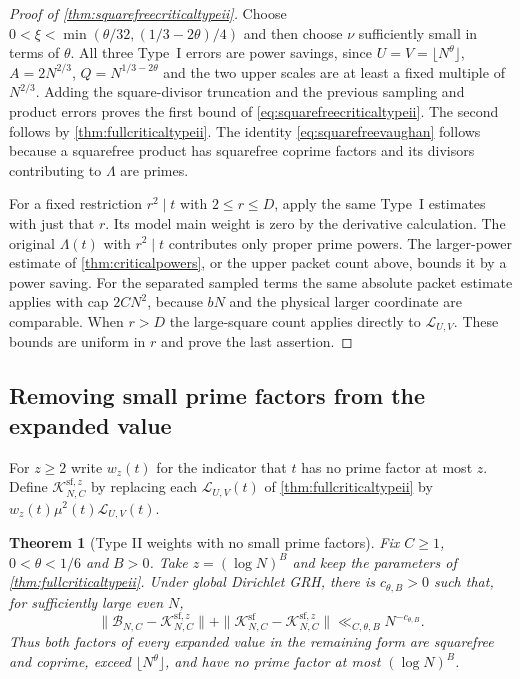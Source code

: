 \documentclass[11pt,a4paper]{article}
\numberwithin{equation}{section}
\newtheorem{theorem}{Theorem}[section]
\begin{document}
\begin{proof}[Proof of \cref{thm:squarefreecriticaltypeii}]
Choose $0<\xi<\min(\theta/32,(1/3-2\theta)/4)$ and
then choose $\nu$ sufficiently small in terms of $\theta$.
All three Type~I errors are power savings, since
$U=V=\lfloor N^\theta\rfloor$, $A=2N^{2/3}$,
$Q=N^{1/3-2\theta}$ and the two upper scales are
at least a fixed multiple of $N^{2/3}$.
Adding the square-divisor truncation and the previous
sampling and product errors proves the first
bound of \cref{eq:squarefreecriticaltypeii}.
The second follows by \cref{thm:fullcriticaltypeii}.
The identity \cref{eq:squarefreevaughan} follows
because a squarefree product has squarefree coprime
factors and its divisors contributing to $\Lambda$
are primes.

For a fixed restriction $r^2\mid t$ with $2\le r\le D$,
apply the same Type~I estimates with just that $r$.
Its model main weight is zero by the derivative
calculation. The original $\Lambda(t)$ with $r^2\mid t$
contributes only proper prime powers. The larger-power
estimate of \cref{thm:criticalpowers}, or the upper
packet count above, bounds it by a power saving.
For the separated sampled terms the same absolute
packet estimate applies with cap $2CN^2$, because $bN$
and the physical larger coordinate are comparable.
When $r>D$ the large-square count applies directly
to $\mathcal L_{U,V}$. These bounds are uniform in
$r$ and prove the last assertion.
\end{proof}

\subsection{Removing small prime factors from the expanded value}

For $z\ge2$ write $w_z(t)$ for the indicator that $t$ has no
prime factor at most $z$. Define $\mathcal K^{\mathrm{sf},z}_{N,C}$
by replacing each $\mathcal L_{U,V}(t)$ of
\cref{thm:fullcriticaltypeii} by
$w_z(t)\mu^2(t)\mathcal L_{U,V}(t)$.

\begin{theorem}[Type II weights with no small prime factors]
\label{thm:roughcriticaltypeii}
Fix $C\ge1$, $0<\theta<1/6$ and $B>0$.
Take $z=(\log N)^B$ and keep the parameters of
\cref{thm:fullcriticaltypeii}. Under global Dirichlet GRH,
there is $c_{\theta,B}>0$ such that, for sufficiently large
even $N$,
\begin{equation}
 \|\mathcal B_{N,C}-\mathcal K^{\mathrm{sf},z}_{N,C}\|
   +\|\mathcal K^{\mathrm{sf}}_{N,C}
                         -\mathcal K^{\mathrm{sf},z}_{N,C}\|
        \ll_{C,\theta,B} N^{-c_{\theta,B}} .
 \label{eq:roughcriticaltypeii}
\end{equation}
Thus both factors of every expanded value in the remaining
form are squarefree and coprime, exceed $\lfloor N^\theta\rfloor$,
and have no prime factor at most $(\log N)^B$.
\end{theorem}
\end{document}
